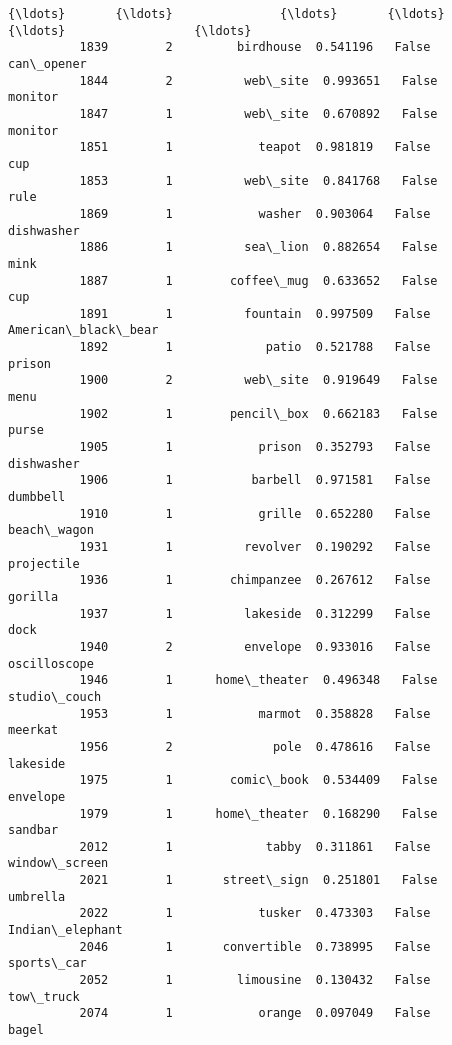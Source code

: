 \documentclass[11pt]{article}
\begin{document}
\begin{Verbatim}[commandchars=\\\{\}]
          {\ldots}       {\ldots}               {\ldots}       {\ldots}     {\ldots}                  {\ldots}   
          1839        2         birdhouse  0.541196   False           can\_opener   
          1844        2          web\_site  0.993651   False              monitor   
          1847        1          web\_site  0.670892   False              monitor   
          1851        1            teapot  0.981819   False                  cup   
          1853        1          web\_site  0.841768   False                 rule   
          1869        1            washer  0.903064   False           dishwasher   
          1886        1          sea\_lion  0.882654   False                 mink   
          1887        1        coffee\_mug  0.633652   False                  cup   
          1891        1          fountain  0.997509   False  American\_black\_bear   
          1892        1             patio  0.521788   False               prison   
          1900        2          web\_site  0.919649   False                 menu   
          1902        1        pencil\_box  0.662183   False                purse   
          1905        1            prison  0.352793   False           dishwasher   
          1906        1           barbell  0.971581   False             dumbbell   
          1910        1            grille  0.652280   False          beach\_wagon   
          1931        1          revolver  0.190292   False           projectile   
          1936        1        chimpanzee  0.267612   False              gorilla   
          1937        1          lakeside  0.312299   False                 dock   
          1940        2          envelope  0.933016   False         oscilloscope   
          1946        1      home\_theater  0.496348   False         studio\_couch   
          1953        1            marmot  0.358828   False              meerkat   
          1956        2              pole  0.478616   False             lakeside   
          1975        1        comic\_book  0.534409   False             envelope   
          1979        1      home\_theater  0.168290   False              sandbar   
          2012        1             tabby  0.311861   False        window\_screen   
          2021        1       street\_sign  0.251801   False             umbrella   
          2022        1            tusker  0.473303   False      Indian\_elephant   
          2046        1       convertible  0.738995   False           sports\_car   
          2052        1         limousine  0.130432   False            tow\_truck   
          2074        1            orange  0.097049   False                bagel   
          

\end{Verbatim}
\end{document}

